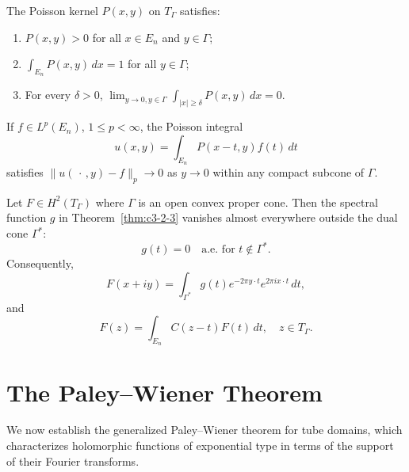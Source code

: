 \begin{theorem}\label{thm:c3-3-6}
The Poisson kernel $P(x, y)$ on $T_\Gamma$ satisfies:
\begin{enumerate}
\item[(i)] $P(x, y) > 0$ for all $x \in E_n$ and $y \in \Gamma$;
\item[(ii)] $\int_{E_n} P(x, y)\,dx = 1$ for all $y \in \Gamma$;
\item[(iii)] For every $\delta > 0$, $\lim_{y \to 0, y \in \Gamma} \int_{|x| \geq \delta} P(x, y)\,dx = 0$.
\end{enumerate}
\end{theorem}

\begin{corollary}\label{cor:c3-3-7}
If $f \in L^p(E_n)$, $1 \leq p < \infty$, the Poisson integral
\begin{equation}\label{eq:c3-3-8}
u(x, y) = \int_{E_n} P(x - t, y) f(t)\,dt
\end{equation}
satisfies $\|u(\,\cdot\,, y) - f\|_p \to 0$ as $y \to 0$ within any compact subcone of $\Gamma$.
\end{corollary}

\begin{theorem}\label{thm:c3-3-9}
Let $F \in H^2(T_\Gamma)$ where $\Gamma$ is an open convex proper cone. Then the spectral function $g$ in Theorem~\ref{thm:c3-2-3} vanishes almost everywhere outside the dual cone $\Gamma^*$:
\begin{equation}\label{eq:c3-3-10}
g(t) = 0 \quad \text{a.e. for } t \notin \Gamma^*.
\end{equation}
Consequently,
\begin{equation}\label{eq:c3-3-11}
F(x + iy) = \int_{\Gamma^*} g(t) e^{-2\pi y \cdot t} e^{2\pi i x \cdot t}\,dt,
\end{equation}
and
\begin{equation}\label{eq:c3-3-12}
F(z) = \int_{E_n} C(z - t) F(t)\,dt, \quad z \in T_\Gamma.
\end{equation}
\end{theorem}

\section{The Paley--Wiener Theorem}

We now establish the generalized Paley--Wiener theorem for tube domains, which characterizes holomorphic functions of exponential type in terms of the support of their Fourier transforms.

